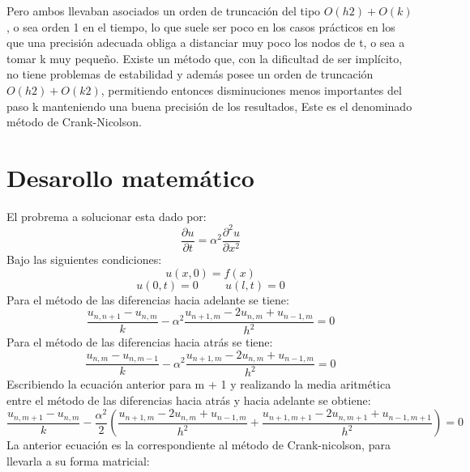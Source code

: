 \documentclass[11pt]{article} %
\begin{document}
Pero ambos llevaban asociados un orden de truncación del tipo $O(h2) + O(k)$, o sea orden 1 en el tiempo, lo que suele ser poco en los casos prácticos en los que una precisión adecuada obliga a distanciar muy poco los nodos de t, o sea a tomar k muy pequeño. Existe un método que, con la dificultad de ser implícito, no tiene problemas de estabilidad y además posee un orden de truncación $O(h2) + O(k2)$, permitiendo entonces disminuciones menos importantes del paso k manteniendo una buena precisión de los resultados, Este es el denominado método de Crank-Nicolson.


\section*{Desarollo matemático}

El probrema a solucionar esta dado por:
$$\frac{\partial u}{\partial t}=\alpha^2\frac{\partial^2 u}{\partial x^2}$$
Bajo las siguientes condiciones:
$$u(x,0)=f(x)$$
$$u(0,t)=0\hspace{1cm}u(l,t)=0$$
Para el método de las diferencias hacia adelante se tiene:
$$\frac{u_{n,n+1}-u_{n,m}}{k}-\alpha^2\frac{u_{n+1,m}-2u_{n,m}+u_{n-1,m}}{h^2}=0$$
Para el método de las diferencias hacia atrás se tiene: 
$$\frac{u_{n,m}-u_{n,m-1}}{k}-\alpha^2\frac{u_{n+1,m}-2u_{n,m}+u_{n-1,m}}{h^2}=0$$
Escribiendo la ecuación anterior para m + 1 y realizando la media aritmética entre el método de las diferencias hacia atrás y hacia adelante se obtiene: 
$$\frac{u_{n,m+1}-u_{n,m}}{k}-\frac{\alpha^2}{2}(\frac{u_{n+1,m}-2u_{n,m}+u_{n-1,m}}{h^2}+\frac{u_{n+1,m+1}-2u_{n,m+1}+u_{n-1,m+1}}{h^2})=0$$
La anterior ecuación es la correspondiente al método de Crank-nicolson, para llevarla a su forma matricial:
\end{document}
